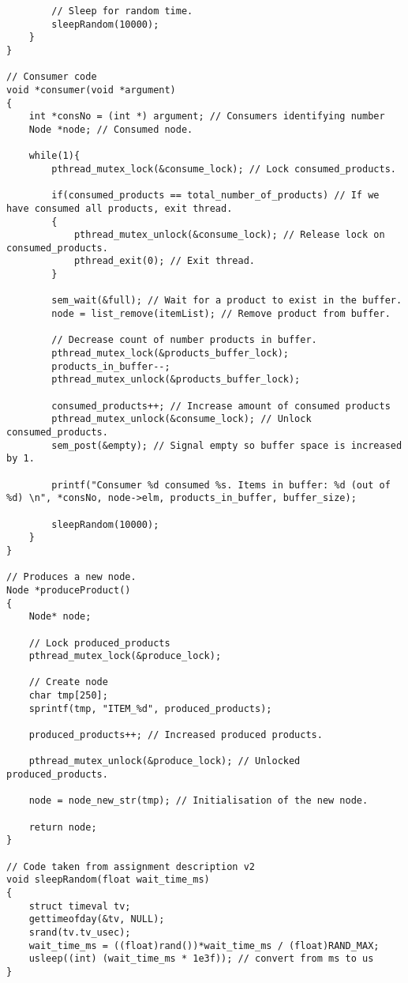\begin{lstlisting}
		// Sleep for random time.
		sleepRandom(10000);
	}
}

// Consumer code
void *consumer(void *argument)
{
	int *consNo = (int *) argument; // Consumers identifying number
	Node *node; // Consumed node.
	
	while(1){
		pthread_mutex_lock(&consume_lock); // Lock consumed_products.
		
		if(consumed_products == total_number_of_products) // If we have consumed all products, exit thread.
		{
			pthread_mutex_unlock(&consume_lock); // Release lock on consumed_products.
			pthread_exit(0); // Exit thread.
		}
		
		sem_wait(&full); // Wait for a product to exist in the buffer.
		node = list_remove(itemList); // Remove product from buffer.

		// Decrease count of number products in buffer.
		pthread_mutex_lock(&products_buffer_lock);
		products_in_buffer--;
		pthread_mutex_unlock(&products_buffer_lock);
		
		consumed_products++; // Increase amount of consumed products
		pthread_mutex_unlock(&consume_lock); // Unlock consumed_products.
		sem_post(&empty); // Signal empty so buffer space is increased by 1.

		printf("Consumer %d consumed %s. Items in buffer: %d (out of %d) \n", *consNo, node->elm, products_in_buffer, buffer_size);
		
		sleepRandom(10000);
	}
}

// Produces a new node.
Node *produceProduct()
{
	Node* node;
	
	// Lock produced_products
	pthread_mutex_lock(&produce_lock);

	// Create node
	char tmp[250];
	sprintf(tmp, "ITEM_%d", produced_products);
	
	produced_products++; // Increased produced products.

	pthread_mutex_unlock(&produce_lock); // Unlocked produced_products.
	
	node = node_new_str(tmp); // Initialisation of the new node.
	
	return node;
}

// Code taken from assignment description v2
void sleepRandom(float wait_time_ms)
{
	struct timeval tv;
	gettimeofday(&tv, NULL);
	srand(tv.tv_usec);
	wait_time_ms = ((float)rand())*wait_time_ms / (float)RAND_MAX;
	usleep((int) (wait_time_ms * 1e3f)); // convert from ms to us
}
\end{lstlisting}